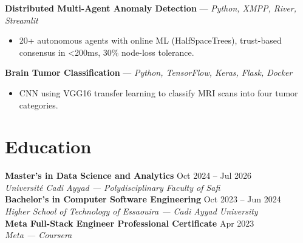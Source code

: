 \documentclass[11pt,a4paper]{article}
\begin{document}
\vspace{2pt}
{\small
\textbf{Distributed Multi-Agent Anomaly Detection} --- \textit{Python, XMPP, River, Streamlit}}
\begin{itemize}[leftmargin=12pt]
  \item {\small 20+ autonomous agents with online ML (HalfSpaceTrees), trust-based consensus in <200ms, 30\% node-loss tolerance.}
\end{itemize}

\vspace{2pt}
{\small
\textbf{Brain Tumor Classification} --- \textit{Python, TensorFlow, Keras, Flask, Docker}}
\begin{itemize}[leftmargin=12pt]
  \item {\small CNN using VGG16 transfer learning to classify MRI scans into four tumor categories.}
\end{itemize}

\section{Education}

{\small
\textbf{Master's in Data Science and Analytics} \hfill Oct 2024 -- Jul 2026 \\
\textit{Universit\'{e} Cadi Ayyad --- Polydisciplinary Faculty of Safi} \\[4pt]
\textbf{Bachelor's in Computer Software Engineering} \hfill Oct 2023 -- Jun 2024 \\
\textit{Higher School of Technology of Essaouira --- Cadi Ayyad University} \\[4pt]
\textbf{Meta Full-Stack Engineer Professional Certificate} \hfill Apr 2023 \\
\textit{Meta --- Coursera}}
\end{document}
